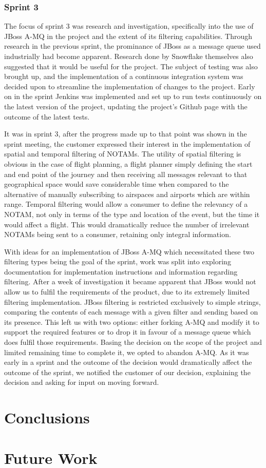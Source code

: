\documentclass[a4paper, 12pt]{article}
\begin{document}
\subsubsection{Sprint 3}

The focus of sprint 3 was research and investigation, specifically into the use of JBoss A-MQ in the project and the extent of its filtering capabilities. Through research in the previous sprint, the prominance of JBoss as a message queue used industrially had become apparent. Research done by Snowflake themselves also suggested that it would be useful for the project. The subject of testing was also brought up, and the implementation of a continuous integration system was decided upon to streamline the implementation of changes to the project. Early on in the sprint Jenkins was implemented and set up to run tests continuously on the latest version of the project, updating the project's Github page with the outcome of the latest tests.

It was in sprint 3, after the progress made up to that point was shown in the sprint meeting, the customer expressed their interest in the implementation of spatial and temporal filtering of NOTAMs. The utility of spatial filtering is obvious in the case of flight planning, a flight planner simply defining the start and end point of the journey and then receiving all messages relevant to that geographical space would save considerable time when compared to the alternative of manually subscribing to airspaces and airports which are within range. Temporal filtering would allow a consumer to define the relevancy of a NOTAM, not only in terms of the type and location of the event, but the time it would affect a flight. This would dramatically reduce the number of irrelevant NOTAMs being sent to a consumer, retaining only integral information.

With ideas for an implementation of JBoss A-MQ which necessitated these two filtering types being the goal of the sprint, work was split into exploring documentation for implementation instructions and information regarding filtering. After a week of investigation it became apparent that JBoss would not allow us to fulfil the requirements of the product, due to its extremely limited filtering implementation. JBoss filtering is restricted exclusively to simple strings, comparing the contents of each message with a given filter and sending based on its presence. This left us with two options: either forking A-MQ and modify it to support the required features or to drop it in favour of a message queue which does fulfil those requirements. Basing the decision on the scope of the project and limited remaining time to complete it, we opted to abandon A-MQ. As it was early in a sprint and the outcome of the decision would dramatically affect the outcome of the sprint, we notified the customer of our decision, explaining the decision and asking for input on moving forward.

\section{Conclusions}
\label{sec:conclusions}

\newpage

\section{Future Work}

\newpage

\sloppy
\printbibliography
\end{document}

